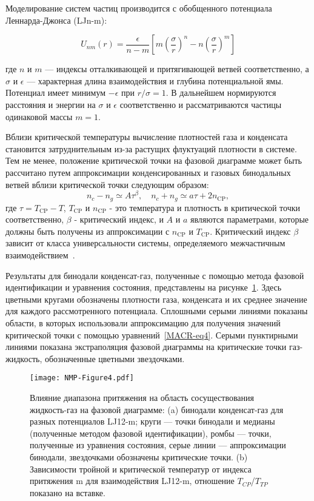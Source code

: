 Моделирование систем частиц производится с обобщенного потенциала Леннарда-Джонса (LJn-m):

\begin{equation}
U_{n m}(r)=\frac{\epsilon}{n-m}\left[m\left(\frac{\sigma}{r}\right)^{n}-n\left(\frac{\sigma}{r}\right)^{m}\right]
\label{LJnm}
\end{equation}

где $n$ и $m$ — индексы отталкивающей и притягивающей ветвей соответственно, а $\sigma$ и $\epsilon$ — характерная длина взаимодействия и глубина потенциальной ямы. Потенциал имеет минимум $-\epsilon$ при $r/\sigma=1$. В дальнейшем нормируются расстояния и энергии на $\sigma$ и $\epsilon$ соответственно и рассматриваются частицы одинаковой массы $m=1$.

Вблизи критической температуры вычисление плотностей газа и конденсата становится затруднительным из-за растущих флуктуаций плотности в системе.
Тем не менее, положение критической точки на фазовой диаграмме может быть рассчитано путем аппроксимации конденсированных и газовых бинодальных ветвей вблизи критической точки следующим образом:
\begin{equation}
    n_{c}-n_{g} \simeq A \tau^{\beta}, \quad n_{c}+n_{g} \simeq a \tau+2 n_{\mathrm{CP}},
\label{MACR-eq4}
\end{equation}
где $\tau=T_{\mathrm{CP}}-T$, $T_{\mathrm{CP}}$ и $n_{\mathrm{CP}}$ - это температура и
плотность в критической точки соответственно, $\beta$ - критический индекс, и $A$ и $a$ являются
параметрами, которые должны быть получены из аппроксимации с $n_{\mathrm{CP}}$ и $T_{\mathrm{CP}}$.
Критический индекс $\beta$ зависит от класса универсальности системы, определяемого межчастичным взаимодействием~\cite{10.1103/physrevlett.89.025703}.

Результаты для бинодали конденсат-газ, полученные с помощью метода фазовой идентификации и уравнения состояния, представлены на рисунке~\ref{nmp}. Здесь цветными кругами обозначены плотности газа, конденсата и их среднее значение для каждого рассмотренного потенциала. Сплошными серыми линиями показаны области, в которых использовали аппроксимацию для получения значений критической точки с помощью уравнений~\ref{MACR-eq4}. Серыми пунктирными линиями показана экстраполяция фазовой диаграммы на критические точки газ-жидкость, обозначенные цветными звездочками.

\begin{figure}[!h]
\begin{center}
\texttt{[image: NMP-Figure4.pdf]}
\caption{Влияние диапазона притяжения на область сосуществования жидкость-газ на фазовой диаграмме: (a) бинодали конденсат-газ для разных потенциалов LJ12-m; круги — точки бинодали и медианы (полученные методом фазовой идентификации), ромбы — точки, полученные из уравнения состояния, серые линии — аппроксимации бинодали, звездочками обозначены критические точки. (b) Зависимости тройной и критической температур от индекса притяжения m для взаимодействия LJ12-m, отношение $T_{CP}$/$T_{TP}$ показано на вставке.}
\label{nmp}
\end{center}
\end{figure}


